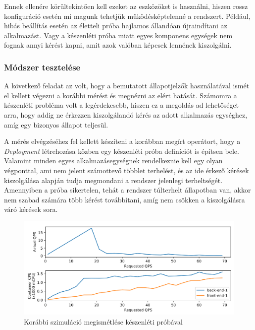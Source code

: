 Ennek ellenére körültekintően kell ezeket az eszközöket is használni, hiszen rossz konfiguráció esetén mi magunk tehetjük működésképtelenné a rendszert.
Például, hibás beállítás esetén az életteli próba hajlamos állandóan újraindítani az alkalmazást. Vagy a készenléti próba miatt egyes komponens egységek nem fognak annyi kérést kapni, amit azok valóban képesek lennének kiszolgálni.

\subsubsection{Módszer tesztelése}
A következő feladat az volt, hogy a bemutatott állapotjelzők használatával ismét el kellett végezni a korábbi mérést és megnézni az elért hatását.
Számomra a készenléti probléma volt a legérdekesebb, hiszen ez a megoldás ad lehetőséget arra, hogy addig ne érkezzen kiszolgálandó kérés az adott alkalmazás egységhez, amíg egy bizonyos állapot teljesül.

A mérés elvégzéséhez fel kellett készíteni a korábban megírt operátort, hogy a \textit{Deployment} létrehozása közben egy készenléti próba definíciót is építsen bele. 
Valamint minden egyes alkalmazásegységnek rendelkeznie kell egy olyan végponttal, ami nem jelent számottevő többlet terhelést, és az ide érkező kérések kiszolgálása alapján tudja megmondani a rendszer jelenlegi terheltségét. 
Amennyiben a próba sikertelen, tehát a rendszer túlterhelt állapotban van, akkor nem szabad számára több kérést továbbítani, amíg nem csökken a kiszolgálásra váró kérések sora.

\begin{figure}[!ht]
\centering
\includegraphics[width=150mm, keepaspectratio]{figures/multiFE-singleBE-readinessprobe-sum-regenerate.png}
\caption{Korábbi szimuláció megismétlése készenléti próbával}
\label{fig:readiness-probe-measurement}
\end{figure}

